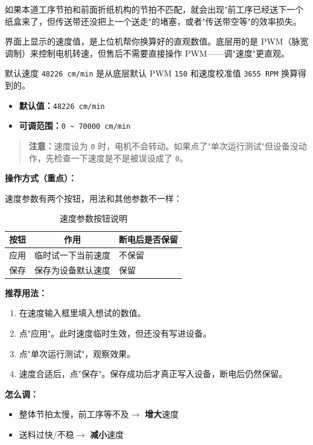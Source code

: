 如果本道工序节拍和前面折纸机构的节拍不匹配，就会出现"前工序已经送下一个纸盒来了，但传送带还没把上一个送走"的堵塞，或者"传送带空等"的效率损失。

界面上显示的速度值，是上位机帮你换算好的直观数值。底层用的是 PWM（脉宽调制）来控制电机转速，但售后不需要直接操作 PWM——调"速度"更直观。

默认速度 \texttt{48226 cm/min} 是从底层默认 PWM \texttt{150} 和速度校准值 \texttt{3655 RPM} 换算得到的。

\begin{itemize}
    \item \textbf{默认值：}\texttt{48226 cm/min}
    \item \textbf{可调范围：}\texttt{0 \textasciitilde{} 70000 cm/min}
\end{itemize}

\begin{quote}
\textbf{注意：}速度设为 \texttt{0} 时，电机不会转动。如果点了"单次运行测试"但设备没动作，先检查一下速度是不是被误设成了 \texttt{0}。
\end{quote}

\textbf{操作方式（重点）：}

速度参数有两个按钮，用法和其他参数不一样：

\begin{table}[H]
    \centering
    \caption{速度参数按钮说明}
    \label{tab:speed-buttons}
    \begin{tabular}{lcp{6cm}}
        \toprule
        \textbf{按钮} & \textbf{作用} & \textbf{断电后是否保留} \\
        \midrule
        应用 & 临时试一下当前速度 & 不保留 \\
        保存 & 保存为设备默认速度 & 保留 \\
        \bottomrule
    \end{tabular}
\end{table}

\textbf{推荐用法：}

\begin{enumerate}[label={(\arabic*)}]
    \item 在速度输入框里填入想试的数值。
    \item 点"应用"。此时速度临时生效，但还没有写进设备。
    \item 点"单次运行测试"，观察效果。
    \item 速度合适后，点"保存"。保存成功后才真正写入设备，断电后仍然保留。
\end{enumerate}

\textbf{怎么调：}
\begin{itemize}
    \item 整体节拍太慢，前工序等不及$\rightarrow$ \textbf{增大}速度
    \item 送料过快/不稳$\rightarrow$ \textbf{减小}速度
\end{itemize}
